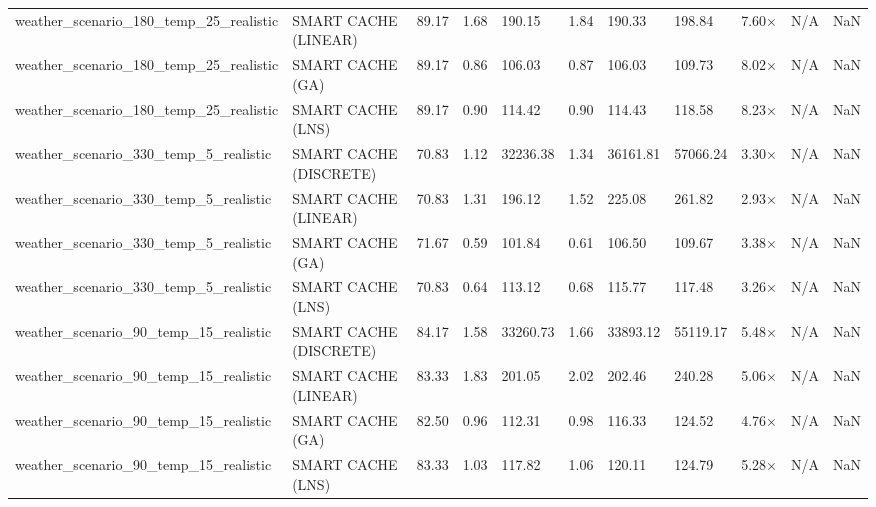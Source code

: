 \begin{table}
\begin{tabular}{lllllllllll}
weather_scenario_180_temp_25_realistic & SMART CACHE (LINEAR) & 89.17 & 1.68 & 190.15 & 1.84 & 190.33 & 198.84 & 7.60× & N/A & NaN \\
weather_scenario_180_temp_25_realistic & SMART CACHE (GA) & 89.17 & 0.86 & 106.03 & 0.87 & 106.03 & 109.73 & 8.02× & N/A & NaN \\
weather_scenario_180_temp_25_realistic & SMART CACHE (LNS) & 89.17 & 0.90 & 114.42 & 0.90 & 114.43 & 118.58 & 8.23× & N/A & NaN \\
weather_scenario_330_temp_5_realistic & SMART CACHE (DISCRETE) & 70.83 & 1.12 & 32236.38 & 1.34 & 36161.81 & 57066.24 & 3.30× & N/A & NaN \\
weather_scenario_330_temp_5_realistic & SMART CACHE (LINEAR) & 70.83 & 1.31 & 196.12 & 1.52 & 225.08 & 261.82 & 2.93× & N/A & NaN \\
weather_scenario_330_temp_5_realistic & SMART CACHE (GA) & 71.67 & 0.59 & 101.84 & 0.61 & 106.50 & 109.67 & 3.38× & N/A & NaN \\
weather_scenario_330_temp_5_realistic & SMART CACHE (LNS) & 70.83 & 0.64 & 113.12 & 0.68 & 115.77 & 117.48 & 3.26× & N/A & NaN \\
weather_scenario_90_temp_15_realistic & SMART CACHE (DISCRETE) & 84.17 & 1.58 & 33260.73 & 1.66 & 33893.12 & 55119.17 & 5.48× & N/A & NaN \\
weather_scenario_90_temp_15_realistic & SMART CACHE (LINEAR) & 83.33 & 1.83 & 201.05 & 2.02 & 202.46 & 240.28 & 5.06× & N/A & NaN \\
weather_scenario_90_temp_15_realistic & SMART CACHE (GA) & 82.50 & 0.96 & 112.31 & 0.98 & 116.33 & 124.52 & 4.76× & N/A & NaN \\
weather_scenario_90_temp_15_realistic & SMART CACHE (LNS) & 83.33 & 1.03 & 117.82 & 1.06 & 120.11 & 124.79 & 5.28× & N/A & NaN \\
\bottomrule
\end{tabular}
\end{table}

